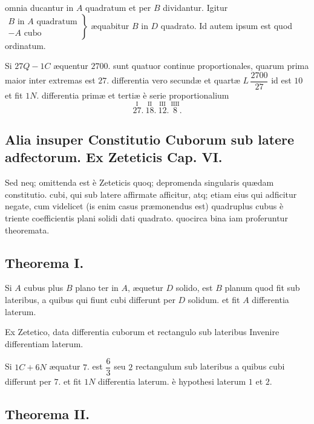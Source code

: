 \documentclass[11pt,a4paper]{article}
\begin{document}
omnia ducantur in $A$ quadratum et per $B$ dividantur. Igitur $\left.\begin{array}{l} B \text{ in } A \text{ quadratum} \\ - A \text{ cubo} \end{array}\right\}$ æquabitur $B$ in $D$ quadrato. Id autem ipsum est quod ordinatum.

Si $27Q - 1C$ æquentur $2700$. sunt quatuor continue proportionales, quarum prima maior inter extremas est $27$. differentia vero secundæ et quartæ $L\,\dfrac{2700}{27}$ id est $10$ et fit $1N.$ differentia primæ et tertiæ è serie proportionalium
\[ \overset{\mathrm{I}}{27}.\ \overset{\mathrm{II}}{18}.\ \overset{\mathrm{III}}{12}.\ \overset{\mathrm{IIII}}{8}. \]

\subsection*{Alia insuper Constitutio Cuborum sub latere adfectorum. Ex Zeteticis Cap. VI.}

Sed neq; omittenda est è Zeteticis quoq; depromenda singularis quædam constitutio. cubi, qui sub latere affirmate afficitur, atq; etiam eius qui adficitur negate, cum videlicet (is enim casus præmonendus est) quadruplus cubus è triente coefficientis plani  solidi dati  quadrato. quocirca bina iam proferuntur theoremata.

\subsection*{Theorema I.}

Si $A$ cubus plus $B$ plano ter in $A$, æquetur $D$ solido, est $B$ planum quod fit sub lateribus, a quibus qui fiunt cubi differunt per $D$ solidum. et fit $A$ differentia laterum.

Ex Zetetico, data differentia cuborum et rectangulo sub lateribus Invenire differentiam laterum.

Si $1C + 6N$ æquatur $7$. est $\dfrac{6}{3}$ seu $2$ rectangulum sub lateribus a quibus cubi differunt per $7$. et fit $1N$ differentia laterum. è hypothesi laterum $1$ et $2$.

\subsection*{Theorema II.}
\end{document}
